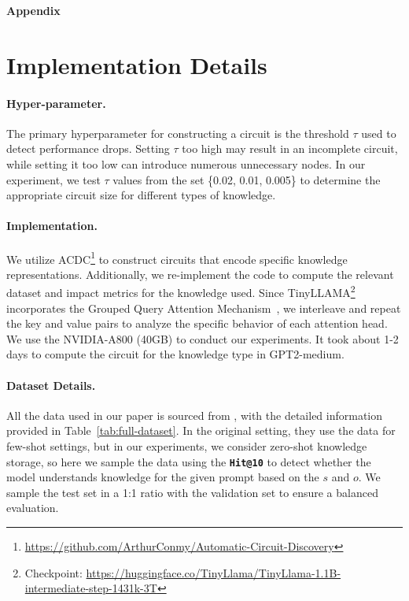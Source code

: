 \appendix
\begin{center}
\Large
\textbf{Appendix}
\end{center}
\section{Implementation Details}
\label{app_sec:implem_details}
\paragraph{Hyper-parameter.}
The primary hyperparameter for constructing a circuit is the threshold \(\tau\) used to detect performance drops.
Setting \(\tau\) too high may result in an incomplete circuit, while setting it too low can introduce numerous unnecessary nodes.
In our experiment, we test \(\tau\) values from the set \{0.02, 0.01, 0.005\} to determine the appropriate circuit size for different types of knowledge.
\paragraph{Implementation.}
We utilize ACDC\footnote{\url{https://github.com/ArthurConmy/Automatic-Circuit-Discovery}} to construct circuits that encode specific knowledge representations.
Additionally, we re-implement the code to compute the relevant dataset and impact metrics for the knowledge used.
Since TinyLLAMA\footnote{Checkpoint: \url{https://huggingface.co/TinyLlama/TinyLlama-1.1B-intermediate-step-1431k-3T}} incorporates the Grouped Query Attention Mechanism~\cite{ainslie-etal-2023-gqa}, we interleave and repeat the key and value pairs to analyze the specific behavior of each attention head.
We use the NVIDIA-A800 (40GB) to conduct our experiments.
It took about 1-2 days to compute the circuit for the knowledge type in GPT2-medium.
\paragraph{Dataset Details.}

All the data used in our paper is sourced from \citet{hernandez2024linearity}, with the detailed information provided in Table~\ref{tab:full-dataset}.
In the original setting, they use the data for few-shot settings, but in our experiments, we consider zero-shot knowledge storage, so here we sample the data using the \texttt{\textbf{Hit@10}} to detect whether the model understands knowledge for the given prompt based on the $s$ and $o$.
We sample the test set in a 1:1 ratio with the validation set to ensure a balanced evaluation.

